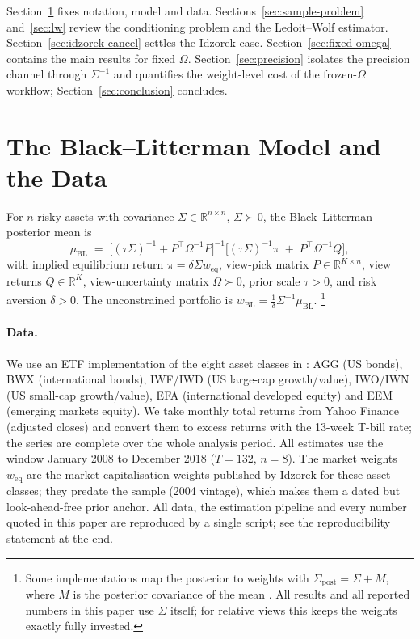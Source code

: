 \documentclass[a4paper,11pt]{article}
\theoremstyle{plain}
\theoremstyle{definition}
\newcommand{\R}{\mathbb{R}}
\newcommand{\Sig}{\Sigma}
\newcommand{\Om}{\Omega}
\newcommand{\muBL}{\mu_{\mathrm{BL}}}
\begin{document}
Section~\ref{sec:blm-brief} fixes notation,
model and data. Sections~\ref{sec:sample-problem} and~\ref{sec:lw} review
the conditioning problem and the Ledoit--Wolf estimator.
Section~\ref{sec:idzorek-cancel} settles the Idzorek case.
Section~\ref{sec:fixed-omega} contains the main results for fixed
$\Omega$. Section~\ref{sec:precision} isolates the precision channel
through $\Sigma^{-1}$ and quantifies the weight-level cost of the
frozen-$\Omega$ workflow; Section~\ref{sec:conclusion} concludes.

\section{The Black--Litterman Model and the Data}
\label{sec:blm-brief}

For $n$ risky assets with covariance $\Sigma\in\R^{n\times n}$,
$\Sigma\succ 0$, the Black--Litterman posterior mean is
\begin{equation}
\label{eq:bl-posterior}
  \muBL \;=\; \bigl[(\tau\Sig)^{-1} + P^\top\Om^{-1}P\bigr]^{-1}
              \bigl[(\tau\Sig)^{-1}\pi \;+\; P^\top\Om^{-1}Q\bigr],
\end{equation}
with implied equilibrium return $\pi = \delta\Sigma w_{\mathrm{eq}}$,
view-pick matrix $P\in\R^{K\times n}$, view returns $Q\in\R^K$,
view-uncertainty matrix $\Om\succ 0$, prior scale $\tau>0$, and risk
aversion $\delta>0$. The unconstrained portfolio is
$w_{\mathrm{BL}} = \tfrac{1}{\delta}\Sigma^{-1}\muBL$.%
\footnote{Some implementations map the posterior to weights with
$\Sigma_{\mathrm{post}} = \Sigma + M$, where $M$ is the posterior
covariance of the mean \citep{HeLitterman1999}. All results and all
reported numbers in this paper use $\Sigma$ itself; for relative views
this keeps the weights exactly fully invested.}

\paragraph{Data.}
We use an ETF implementation of the eight asset classes in
\citet{Idzorek2007}: AGG (US bonds), BWX (international bonds), IWF/IWD
(US large-cap growth/value), IWO/IWN (US small-cap growth/value), EFA
(international developed equity) and EEM (emerging markets equity). We
take monthly total returns from Yahoo Finance (adjusted closes) and
convert them to excess returns with the 13-week T-bill rate; the series
are complete over the whole analysis period. All estimates use the
window January 2008 to December 2018 ($T=132$, $n=8$). The market weights
$w_{\mathrm{eq}}$ are the market-capitalisation weights published by
Idzorek for these asset classes; they predate the sample (2004 vintage),
which makes them a dated but look-ahead-free prior anchor. All data,
the estimation pipeline and every number quoted in this paper are
reproduced by a single script; see the reproducibility statement at the
end.
\end{document}
